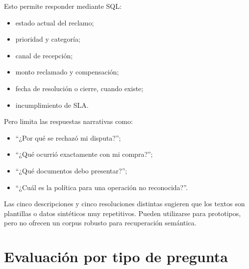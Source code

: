 \documentclass[11pt,a4paper]{article}
\begin{document}
Esto permite responder mediante SQL:

\begin{itemize}
  \item estado actual del reclamo;
  \item prioridad y categoría;
  \item canal de recepción;
  \item monto reclamado y compensación;
  \item fecha de resolución o cierre, cuando existe;
  \item incumplimiento de SLA.
\end{itemize}

Pero limita las respuestas narrativas como:

\begin{itemize}
  \item “¿Por qué se rechazó mi disputa?”;
  \item “¿Qué ocurrió exactamente con mi compra?”;
  \item “¿Qué documentos debo presentar?”;
  \item “¿Cuál es la política para una operación no reconocida?”.
\end{itemize}

Las cinco descripciones y cinco resoluciones distintas sugieren que los textos son plantillas o datos sintéticos muy repetitivos. Pueden utilizarse para prototipos, pero no ofrecen un corpus robusto para recuperación semántica.

\section{Evaluación por tipo de pregunta}
\end{document}
